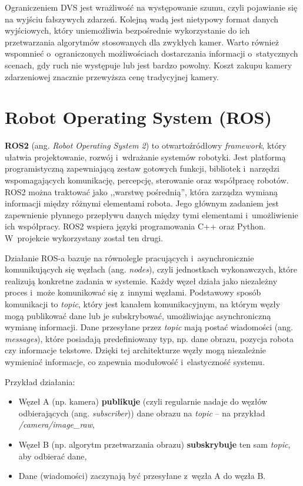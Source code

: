 Ograniczeniem DVS jest wrażliwość na występowanie szumu, czyli pojawianie się na wyjściu fałszywych zdarzeń. Kolejną wadą jest nietypowy format danych wyjściowych, który uniemożliwia bezpośrednie wykorzystanie do ich przetwarzania algorytmów stosowanych dla zwykłych kamer. Warto również wspomnieć o~ograniczonych możliwościach dostarczania informacji o~statycznych scenach, gdy ruch nie występuje lub jest bardzo powolny. Koszt zakupu kamery zdarzeniowej znacznie przewyższa cenę tradycyjnej kamery.

\section{Robot Operating System (ROS)}


\textbf{ROS2} (ang. \textit{Robot Operating System 2}) to otwartoźródłowy \textit{framework}, który ułatwia projektowanie, rozwój i~wdrażanie systemów robotyki. Jest platformą programistyczną zapewniającą zestaw gotowych funkcji, bibliotek i~narzędzi wspomagających komunikację, percepcję, sterowanie oraz współpracę robotów. ROS2 można traktować jako ,,warstwę pośrednią'', która zarządza wymianą informacji między różnymi elementami robota. Jego głównym zadaniem jest zapewnienie płynnego przepływu danych między tymi elementami i~umożliwienie ich współpracy.
ROS2 wspiera języki programowania C++ oraz Python. W~projekcie wykorzystany został ten drugi.

Działanie ROS-a bazuje na równolegle pracujących i~asynchronicznie komunikujących się węzłach (ang. \textit{nodes}), czyli jednostkach wykonawczych, które realizują konkretne zadania w systemie. Każdy węzeł działa jako niezależny proces i~może komunikować się z~innymi węzłami. Podstawowy sposób komunikacji to \textit{topic}, który jest kanałem komunikacyjnym, na którym węzły mogą publikować dane lub je subskrybować, umożliwiając asynchroniczną wymianę informacji. Dane przesyłane przez \textit{topic} mają postać wiadomości (ang. \textit{messages}), które posiadają predefiniowany typ, np. dane obrazu, pozycja robota czy informacje tekstowe. Dzięki tej architekturze węzły mogą niezależnie wymieniać informacje, co zapewnia modułowość i~elastyczność systemu.

Przykład działania:
\begin{itemize}
    \item Węzeł A (np. kamera) \textbf{publikuje} (czyli regularnie nadaje do węzłów odbierających (ang. \textit{subscriber})) dane obrazu na \textit{topic} -- na przykład \textit{/camera/image\_raw},
    \item Węzeł B (np. algorytm przetwarzania obrazu) \textbf{subskrybuje} ten sam \textit{topic}, aby odbierać dane,
    \item Dane (wiadomości) zaczynają być przesyłane z~węzła A do węzła B.
\end{itemize}
    
